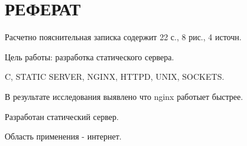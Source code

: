 \section*{\hfill{\centering РЕФЕРАТ }\hfill}

Расчетно пояснительная записка содержит 22 с., 8 рис., 4 источн. 

Цель работы: разработка статического сервера.

C, STATIC SERVER, NGINX, HTTPD, UNIX, SOCKETS.

В результате исследования выявлено что nginx работыет быстрее.

Разработан статический сервер.

Область применения - интернет.


